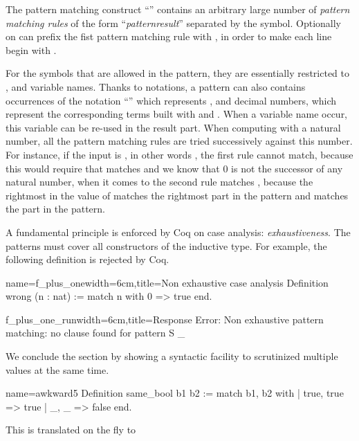 The pattern matching construct ``'' contains an
arbitrary large number of {\em pattern matching rules} of the form
``\emph{pattern}\C{ =>$~$}\emph{result}'' 
separated by the \C{|} symbol.  Optionally on can
prefix the fist pattern matching rule with \C{|}, in order to make each line
begin with \C{|}.

For the symbols that are allowed
in the pattern, they are essentially restricted to ,  and
variable names.  Thanks to notations, a pattern can also contains
occurrences of the notation ``'' which represents , and
decimal numbers, which represent the corresponding terms built with
 and .  When a variable name occur, this variable can be
re-used in the result part.  When computing with a natural number, all
the pattern matching rules are tried successively against this number.
For instance, if the input is , in other words , the first
rule cannot match, because this would require that  matches
 and we know that \(0\) is not the successor of any
natural number, when it comes to the second rule  matches
, because the rightmost  in the value of  matches
the rightmost  part in the pattern and  matches the  part
in the pattern.

A fundamental principle is enforced by Coq on case analysis:
\emph{exhaustiveness}.  The patterns must cover all constructors of
the inductive type.  For example, the following definition is
rejected by Coq.

\begin{coq}{name=f_plus_one}{width=6cm,title=Non exhaustive case analysis}
Definition wrong (n : nat) :=
  match n with 0 => true end.
$~$
\end{coq}
\begin{coqout}{f_plus_one_run}{width=6cm,title=Response}
Error: Non exhaustive pattern
matching: no clause found for
pattern S _
\end{coqout}

We conclude the section by showing a syntactic facility to scrutinized
multiple values at the same time.

\begin{coq}{name=awkward5}{}
Definition same_bool b1 b2 :=
  match b1, b2 with
  | true, true => true
  | _, _ => false
  end.
\end{coq}

This is translated on the fly to

